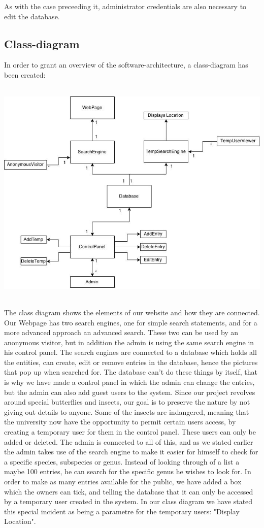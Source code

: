 \documentclass[12pt,a4paper]{article}
\begin{document}
As with the case preceeding it, administrator credentials are also necessary to edit the database.
\newpage

\subsection{Class-diagram}

In order to grant an overview of the software-architecture, a class-diagram has been created:

\includegraphics[height=110mm]{ClassDiagram.png}

The class diagram shows the elements of our website and how they are connected. Our Webpage has two search engines, one for simple search statements, and for a more advanced approach an advanced search. These two can be used by an anonymous visitor, but in addition the admin is using the same search engine in his control panel. The search engines are connected to a database which holds all the entities, can create, edit or remove entries in the database, hence the pictures that pop up when searched for. The database can't do these things by itself, that is why we have made a control panel in which the admin can change the entries, but the admin can also add guest users to the system. Since our project revolves around special butterflies and insects, our goal is to preserve the nature by not giving out details to anyone. Some of the insects are indangered, meaning that the university now have the opportunity to permit certain users access, by creating a temporary user for them in the control panel. These users can only be added or deleted. The admin is connected to all of this, and as we stated earlier the admin takes use of the search engine to make it easier for himself to check for a specific species, subspecies or genus. Instead of looking through of a list a maybe 100 entries, he can search for the specific genus he wishes to look for. In order to make as many entries available for the public, we have added a box which the owners can tick, and telling the database that it can only be accessed by a temporary user created in the system. In our class diagram we have stated this special incident as being a parametre for the temporary users: "Display Location".
\newpage
\end{document}

